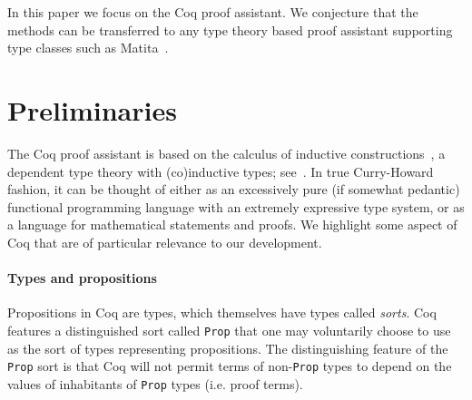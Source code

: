 \documentclass[a4paper,10pt,runningheads]{llncs}
\begin{document}
% 
% 
% 
% 
% 
% 
% 
% 


In this paper we focus on the Coq proof assistant. We conjecture that the methods can be transferred
to any type theory based proof assistant supporting type classes such as
Matita~\cite{asperti2007user}.



\section{Preliminaries}
\label{preliminaries}


The Coq proof assistant is based on the calculus of inductive
constructions~\cite{CoquandHuet,CoquandPaulin}, a dependent type theory with (co)inductive types; see~\cite{Coq,BC04}. In true Curry-Howard fashion, it can be thought of either as an excessively pure (if somewhat pedantic) functional programming language with an extremely expressive type system, or as a language for mathematical statements and proofs. We highlight some aspect of Coq that are of particular relevance to our development.

\paragraph{Types and propositions}

Propositions in Coq are types, which themselves have types called \emph{sorts}. Coq features a distinguished sort called \lstinline|Prop| that one may voluntarily choose to use as the sort of types representing propositions. The distinguishing feature of the \lstinline|Prop| sort is that Coq will not permit terms of non-\lstinline|Prop| types to depend on the values of inhabitants of \lstinline|Prop| types (i.e. proof terms).
\end{document}
